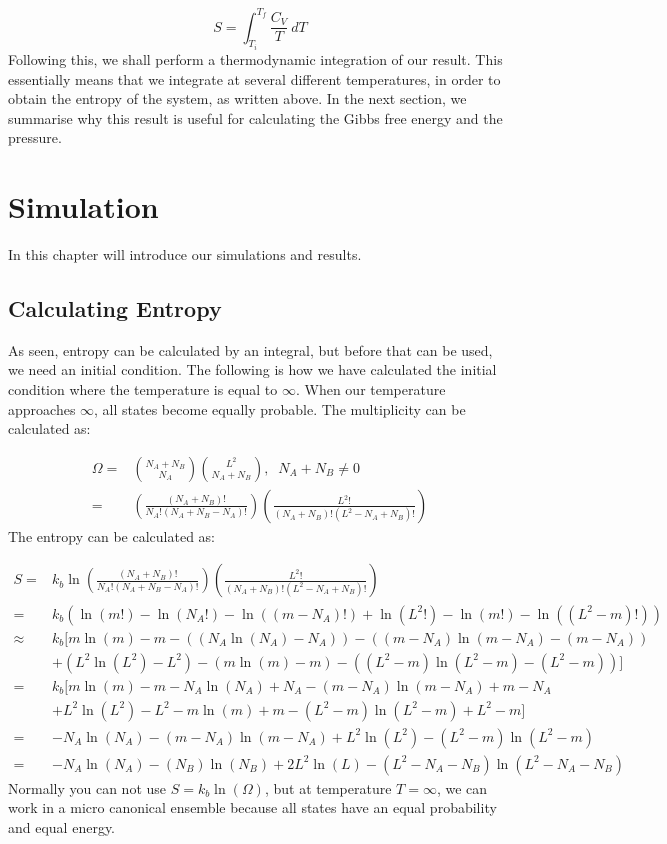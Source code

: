 \documentclass[12pt,a4paper]{report}
\begin{document}
\begin{equation}
S = \int^{T_f}_{T_i} \frac{C_V}{T}\ dT
\end{equation}
Following this, we shall perform a thermodynamic integration of our result. This essentially means that we integrate at several different temperatures, in order to obtain the entropy of the system, as written above. In the next section, we summarise why this result is useful for calculating the Gibbs free energy and the pressure.






\chapter{Simulation}
In this chapter will introduce our simulations and results.

\section{Calculating Entropy}
As seen, entropy can be calculated by an integral, but before that can be used, we need an initial condition. The following is how we have calculated the initial condition where the temperature is equal to $\infty$. When our temperature approaches $\infty$, all states become equally probable. The multiplicity can be calculated as:

\begin{align}
\Omega=&\binom{N_A+N_B}{N_A}\binom{L^2}{N_A+N_B}, \;\; N_A+N_B\neq 0\\
=&\left(\frac{(N_A+N_B)!}{N_A!(N_A+N_B-N_A)!}\right) \left(\frac{L^2!}{(N_A+N_B)!(L^2-N_A+N_B)!}\right)
\end{align}
The entropy can be calculated as:

\begin{align}
S =& k_b \ln \left( \frac{(N_A+N_B)!}{N_A!(N_A+N_B-N_A)!}\right) \left( \frac{L^2!}{(N_A+N_B)!(L^2-N_A+N_B)!}\right)\\
=& k_b \left( \ln(m!)-\ln(N_A!)-\ln((m-N_A)!)+\ln(L^2!)-\ln(m!)- \ln((L^2-m)!) \right)\\
\approx& k_b [ m\ln(m)-m -((N_A\ln(N_A)-N_A)) - ((m-N_A)\ln(m-N_A)-(m-N_A)) \\ 
& +(L^2 \ln(L^2)-L^2)-(m\ln(m)-m)-((L^2-m)\ln(L^2-m)-(L^2-m)) ] \\
=& k_b[	m\ln(m)-m - N_A\ln(N_A)+N_A-(m-N_A)\ln(m-N_A)+m-N_A \\
& +L^2\ln(L^2)-L^2 - m\ln(m)+m - (L^2-m)\ln(L^2-m)+L^2-m] \\
=& -N_A\ln(N_A)-(m-N_A)\ln(m-N_A)+L^2\ln(L^2)-(L^2-m)\ln(L^2-m)\\
=& -N_A\ln(N_A)-(N_B)\ln(N_B)+2L^2\ln(L)-(L^2-N_A-N_B)\ln(L^2-N_A-N_B)
\end{align}
Normally you can not use $S = k_b\ln(\Omega)$, but at temperature $T=\infty$, we can work in a micro canonical ensemble because all states have an equal probability and equal energy.
\end{document}
